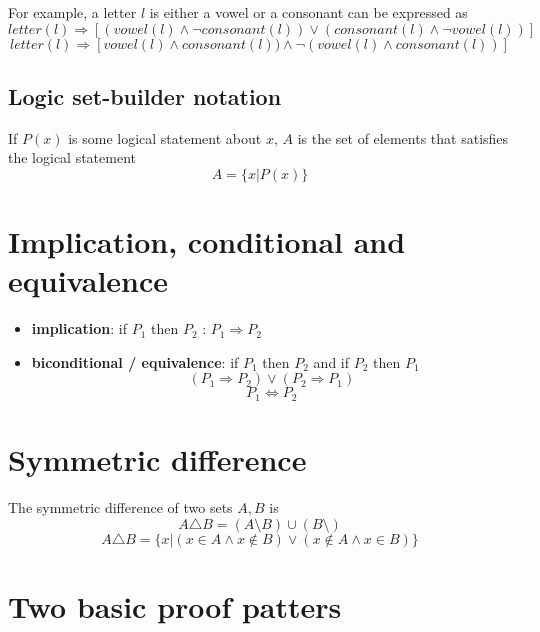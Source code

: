 For example, a letter $l$ is either a vowel or a consonant can be expressed as
\[
   letter(l) \Rightarrow [
   (vowel(l) \land \lnot consonant(l)) \lor (consonant(l) \land \lnot vowel(l))
   ] 
\] 
\[
   letter(l) \Rightarrow [
   vowel(l) \land consonant(l)) \land \lnot (vowel(l) \land consonant(l))
   ]
\] 

\subsection{Logic set-builder notation}
\begin{framed}
   If $P(x)$ is some logical statement about $x$, $A$ is the set of elements that satisfies the logical statement
   \[
     A = \{ x | P(x)\} 
   \] 
  
\end{framed}


\section{Implication, conditional and equivalence}
\begin{framed}
\begin{itemize}
   \item \textbf{implication}: if $P_1$ then $P_2$ : $P_1 \Rightarrow P_2$ 
   \item \textbf{biconditional / equivalence}: if $P_1$ then $P_2$ and if  $P_2$ then $P_1$ 
      \[
         \left( P_1 \Rightarrow P_2 \right)  \lor \left( P_2 \Rightarrow P_1 \right) 
      \] 
      \[
        P_1 \iff P_2
      \]
\end{itemize}
\end{framed}

\section{Symmetric difference}
\begin{framed}
   The symmetric difference of two sets $A, B$ is 
   \[
     A \triangle B = \left( A \setminus B \right) \cup \left( B \setminus \right) 
   \] 
   \[
     A \triangle B = \{ x | \left( x \in A \land x \notin B \right) \lor \left( x \notin A \land x \in B \right)   \} 
   \] 
\end{framed}


\section{Two basic proof patters}

